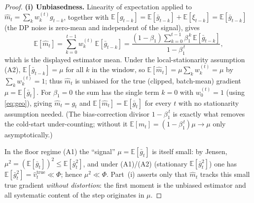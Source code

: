 \begin{proof}
\medskip
\par\smallskip\noindent\textbf{(i) Unbiasedness.}\quad 
Linearity of expectation applied to $\hat m_t=\sum_k w_k^{(t)}g_{t-k}$, together with
$\mathbb E[g_{t-k}]=\mathbb E[\bar g_{t-k}]+\mathbb E[\xi_{t-k}]=\mathbb E[\bar g_{t-k}]$ (the DP noise
is zero-mean and independent of the signal), gives
\begin{equation}\label{eq:mhat-mean}
  \mathbb E[\hat m_t]
  =\sum_{k=0}^{t-1}w_k^{(t)}\,\mathbb E[\bar g_{t-k}]
  =\frac{(1-\beta_1)\sum_{k=0}^{t-1}\beta_1^{\,k}\,\mathbb E[\bar g_{t-k}]}{1-\beta_1^{\,t}},
\end{equation}
which is the displayed estimator mean. Under the local-stationarity assumption (A2),
$\mathbb E[\bar g_{t-k}]=\mu$ for all $k$ in the window, so $\mathbb E[\hat m_t]=\mu\sum_k w_k^{(t)}=\mu$
by $\sum_k w_k^{(t)}=1$; thus $\hat m_t$ is unbiased for the true (clipped, batch-mean) gradient
$\mu=\mathbb E[\bar g_t]$. For $\beta_1=0$ the sum has the single term $k=0$ with $w_0^{(t)}=1$ (using
\eqref{eq:geo}), giving $\hat m_t=g_t$ and $\mathbb E[\hat m_t]=\mathbb E[\bar g_t]$ for every $t$ with
no stationarity assumption needed. (The bias-correction divisor $1-\beta_1^{\,t}$ is exactly what
removes the cold-start under-counting; without it $\mathbb E[m_t]=(1-\beta_1^{\,t})\mu\to\mu$ only
asymptotically.)

In the floor regime (A1) the ``signal'' $\mu=\mathbb E[\bar g_t]$ is itself small: by Jensen,
$\mu^2=(\mathbb E[\bar g_t])^2\le \mathbb E[\bar g_t^2]$, and under (A1)/(A2) (stationary $\mathbb
E[\bar g_t^2]$) one has $\mathbb E[\bar g_t^2]=\hat v_t^{\mathrm{true}}\ll\Phi$; hence $\mu^2\ll\Phi$.
Part~(i) asserts only that $\hat m_t$ tracks this small true gradient \emph{without distortion}: the
first moment is the unbiased estimator and all systematic content of the step originates in $\mu$.


\end{proof}
